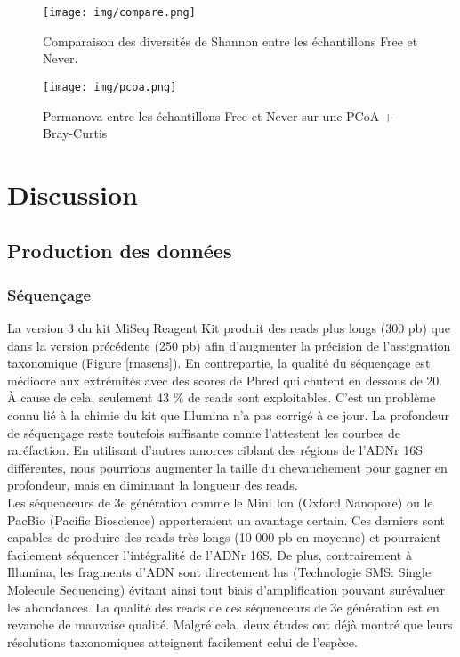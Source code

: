 \documentclass[12pt,a4paper]{article}
\begin{document}
\begin{figure}[H]
\begin{center}
\texttt{[image: img/compare.png]}\hfill
\end{center}
\caption{Comparaison des diversités de Shannon entre les échantillons Free et Never.}
\label{compare}
\end{figure}


\begin{figure}[H]
\begin{center}
\texttt{[image: img/pcoa.png]}\hfill
\end{center}
\caption{Permanova entre les échantillons Free et Never sur une PCoA + Bray-Curtis}
\label{pcoa}
\end{figure}

\newpage
\section{Discussion}
\subsection{Production des données}
\subsubsection{Séquençage}
La version 3 du kit MiSeq Reagent Kit produit des reads plus longs (300 pb) que dans la version précédente (250 pb) afin d'augmenter la précision de l'assignation taxonomique (Figure \ref{rnasens}). En contrepartie, la qualité du séquençage est médiocre aux extrémités avec des scores de Phred qui chutent en dessous de 20. À cause de cela, seulement 43 \% de reads sont exploitables.
C'est un problème connu lié à la chimie du kit que Illumina n'a pas corrigé à ce jour. La profondeur de séquençage reste toutefois suffisante comme l'attestent les courbes de raréfaction. En utilisant d'autres amorces ciblant des régions de l'ADNr 16S différentes, nous pourrions augmenter la taille du chevauchement pour gagner en profondeur, mais en diminuant la longueur des reads. \\
Les séquenceurs de 3e génération comme le Mini Ion (Oxford Nanopore) ou le PacBio (Pacific Bioscience) apporteraient un avantage certain. Ces derniers sont capables de produire des reads très longs (10 000 pb en moyenne) et pourraient facilement séquencer l'intégralité de l'ADNr 16S. De plus, contrairement à Illumina, les fragments d'ADN sont directement lus (Technologie SMS: Single Molecule Sequencing) évitant ainsi tout biais d'amplification pouvant surévaluer les abondances.
La qualité des reads de ces séquenceurs de 3e génération est en revanche de mauvaise qualité. Malgré cela, deux études\cite{Wagner2016,Benitez-Paez2016} ont déjà montré que leurs résolutions taxonomiques atteignent facilement celui de l’espèce.
\end{document}
